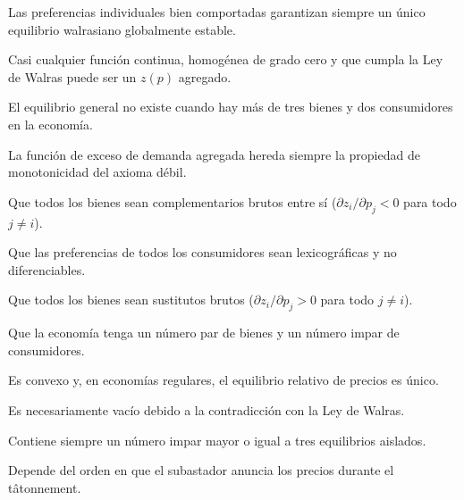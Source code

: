 \begin{opts}
    \item Las preferencias individuales bien comportadas garantizan siempre un único equilibrio walrasiano globalmente estable.
    \item Casi cualquier función continua, homogénea de grado cero y que cumpla la Ley de Walras puede ser un $z(p)$ agregado.
    \item El equilibrio general no existe cuando hay más de tres bienes y dos consumidores en la economía.
    \item La función de exceso de demanda agregada hereda siempre la propiedad de monotonicidad del axioma débil.
\end{opts}

\begin{opts}
    \item Que todos los bienes sean complementarios brutos entre sí ($\partial z_i / \partial p_j < 0$ para todo $j \neq i$).
    \item Que las preferencias de todos los consumidores sean lexicográficas y no diferenciables.
    \item Que todos los bienes sean sustitutos brutos ($\partial z_i / \partial p_j > 0$ para todo $j \neq i$).
    \item Que la economía tenga un número par de bienes y un número impar de consumidores.
\end{opts}

\begin{opts}
    \item Es convexo y, en economías regulares, el equilibrio relativo de precios es único.
    \item Es necesariamente vacío debido a la contradicción con la Ley de Walras.
    \item Contiene siempre un número impar mayor o igual a tres equilibrios aislados.
    \item Depende del orden en que el subastador anuncia los precios durante el tâtonnement.
\end{opts}

